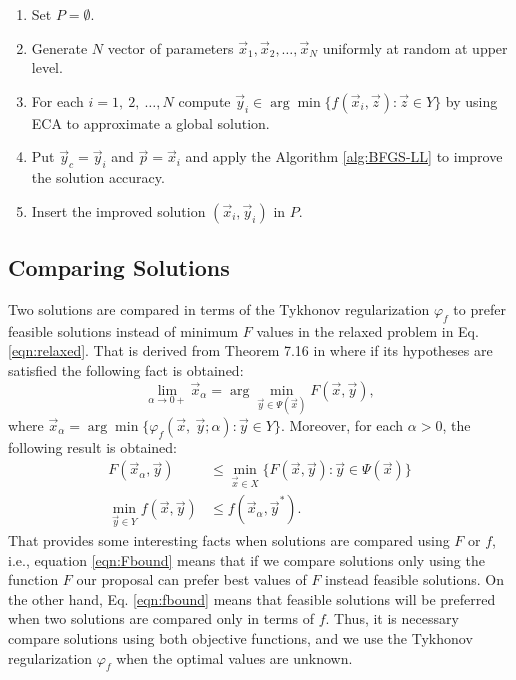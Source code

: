 \documentclass[conference]{IEEEtran}
\theoremstyle{definition}
\begin{document}
\begin{enumerate}
    \item Set $P = \emptyset $.
    \item Generate $N$ vector of parameters $\vec{x}_1, \vec{x}_2, \ldots, \vec{x}_N$
          uniformly at random at upper level.
    \item For each $i=1,\ 2,\ \ldots,N$ compute
            $\vec{y}_i \in \arg \min \{ f(\vec{x}_i, \vec{z}) : \vec{z} \in Y \}$
          by using ECA to approximate a global solution.
    \item Put $\vec{y}_c = \vec{y}_i$ and $\vec{p} = \vec{x}_i$ and apply the
          Algorithm \ref{alg:BFGS-LL} to improve the solution accuracy.
    \item Insert the improved solution $(\vec{x}_i, \vec{y}_i)$ in $P$.
\end{enumerate}

\subsection{Comparing Solutions} %
\label{sub:comparing_solutions}

Two solutions are compared in terms of the Tykhonov regularization $\varphi_f$
to prefer feasible solutions instead of minimum $F$ values in the relaxed problem
in Eq. \ref{eqn:relaxed}. That is derived from Theorem 7.16 in \cite{dempe2002foundations}
where if its hypotheses are satisfied the following fact is obtained:
% 
\[
    \lim_{\alpha \to 0+} \vec{x}_\alpha = \arg \min_{\vec{y} \in \Psi(\vec{x})} F(\vec{x}, \vec{y}),
\]
%
where $\vec{x}_\alpha = \arg \min\{\varphi_f (\vec{x},\ \vec{y}; \alpha) : \vec{y} \in Y\} $.
Moreover, for each $\alpha > 0$, the following result is obtained:
% 
\begin{align}
    \label{eqn:Fbound}
    F(\vec{x}_\alpha, \vec{y}) &\leq \min_{ \vec{x} \in X} \{ F(\vec{x}, \vec{y}) : \vec{y} \in \Psi(\vec{x}) \} \\
    \label{eqn:fbound}
    \min_{\vec{y} \in Y } f(\vec{x}, \vec{y}) &\leq f(\vec{x}_\alpha, \vec{y}^*).
\end{align}
% 
That provides some interesting facts when solutions are compared using $F$ or $f$,
i.e.,  equation \ref{eqn:Fbound} means that if we compare solutions only using the
function $F$ our proposal can prefer best values of $F$ instead feasible solutions.
On the other hand, Eq. \ref{eqn:fbound} means that feasible solutions will be
preferred when two solutions are compared only in  terms of $f$. Thus, it is
necessary compare solutions using both objective functions, and we use the Tykhonov
regularization $\varphi_f$ when the optimal values are unknown.
\end{document}

